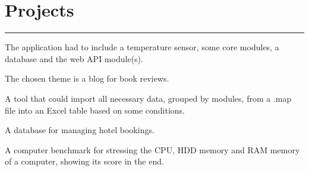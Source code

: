 \documentclass[]{mihocandreea-resume}
\begin{document}
\begin{minipage}[t]{0.66\textwidth}
\section{Projects}
\noindent\rule{12.5cm}{0.4pt}
\noindent
\hspace{5em}%
\begin{minipage}{0.85\textwidth\vspace{5pt}}
The application had to include a temperature sensor, some core modules, a database and the web API module(s).
\end{minipage}
\noindent
\hspace{5em}%
\begin{minipage}{0.85\textwidth\vspace{5pt}}
The chosen theme is a blog for book reviews.
\end{minipage}
\noindent
\hspace{5em}%
\begin{minipage}{0.85\textwidth\vspace{5pt}}
A tool that could import all necessary data, grouped by modules, from a .map file into an Excel table based on some conditions.
\end{minipage}
\noindent
\hspace{5em}%
\begin{minipage}{0.85\textwidth\vspace{5pt}}
A database for managing hotel bookings.
\end{minipage}
\noindent
\hspace{5em}%
\begin{minipage}{0.85\textwidth\vspace{5pt}}
A computer benchmark for stressing the CPU, HDD memory and RAM memory of a
computer, showing its score in the end.
\end{minipage}
\end{minipage} 
\end{document}
